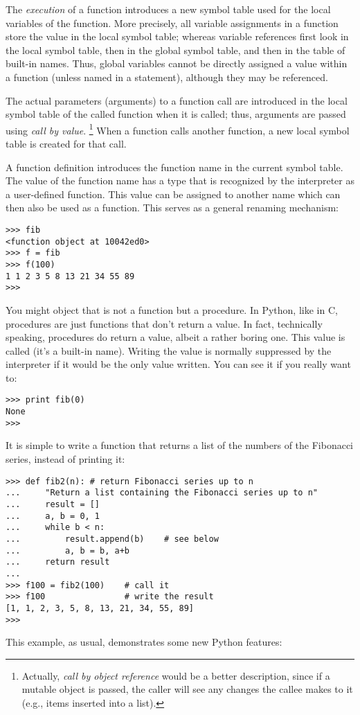 The \emph{execution} of a function introduces a new symbol table used
for the local variables of the function.  More precisely, all variable
assignments in a function store the value in the local symbol table;
whereas variable references first look in the local symbol table, then
in the global symbol table, and then in the table of built-in names.
Thus, 
global variables cannot be directly assigned a value within a
function (unless named in a  statement), although
they may be referenced.

The actual parameters (arguments) to a function call are introduced in
the local symbol table of the called function when it is called; thus,
arguments are passed using \emph{call by value}.%
\footnote{
         Actually, \emph{call by object reference} would be a better
         description, since if a mutable object is passed, the caller
         will see any changes the callee makes to it (e.g., items
         inserted into a list).
}
When a function calls another function, a new local symbol table is
created for that call.

A function definition introduces the function name in the
current
symbol table.  The value
of the function name
has a type that is recognized by the interpreter as a user-defined
function.  This value can be assigned to another name which can then
also be used as a function.  This serves as a general renaming
mechanism:

\bcode\begin{verbatim}
>>> fib
<function object at 10042ed0>
>>> f = fib
>>> f(100)
1 1 2 3 5 8 13 21 34 55 89
>>> 
\end{verbatim}\ecode
%
You might object that  is not a function but a procedure.  In
Python, like in C, procedures are just functions that don't return a
value.  In fact, technically speaking, procedures do return a value,
albeit a rather boring one.  This value is called  (it's a
built-in name).  Writing the value  is normally suppressed by
the interpreter if it would be the only value written.  You can see it
if you really want to:

\bcode\begin{verbatim}
>>> print fib(0)
None
>>> 
\end{verbatim}\ecode
%
It is simple to write a function that returns a list of the numbers of
the Fibonacci series, instead of printing it:

\bcode\begin{verbatim}
>>> def fib2(n): # return Fibonacci series up to n
...     "Return a list containing the Fibonacci series up to n"
...     result = []
...     a, b = 0, 1
...     while b < n:
...         result.append(b)    # see below
...         a, b = b, a+b
...     return result
... 
>>> f100 = fib2(100)    # call it
>>> f100                # write the result
[1, 1, 2, 3, 5, 8, 13, 21, 34, 55, 89]
>>> 
\end{verbatim}\ecode
%
This example, as usual, demonstrates some new Python features:

